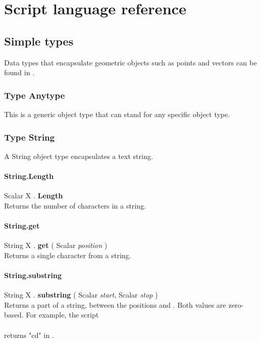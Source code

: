 \chapter{Script language reference}

\section{Simple types \label{Simple types}}

Data types that encapsulate geometric objects such as points and vectors can be found in .

\subsection{Type Anytype \label{T:Anytype}}
This is a generic object type that can stand for any specific object type.

\subsection{Type String \label{T:String}}
A String object type encapsulates a text string.

\subsubsection{String.Length \label{F:String:Length}}
Scalar X . \textbf{Length} \\
Returns the number of characters in a string.

\subsubsection{String.get \label{F:String:get}}
String X . \textbf{get} ( Scalar \textit{position} ) \\
Returns a single character from a string.

\subsubsection{String.substring \label{F:String:substring}}
String X . \textbf{substring} ( Scalar \textit{start}, Scalar \textit{stop} ) \\
Returns a part of a string, between the positions  and . Both values are zero-based. For example, the script \\
 \\
returns "cd" in .

